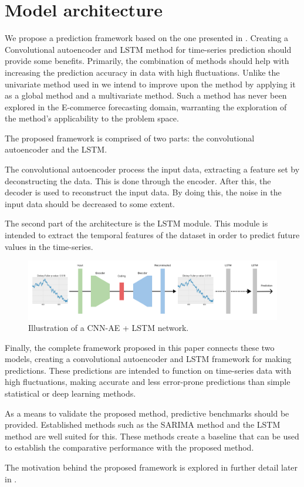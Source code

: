 \section{Model architecture}
\label{section:Architecture:Model}

We propose a prediction framework based on the one presented in \cite{Zhao2019}.
Creating a Convolutional autoencoder and LSTM method for time-series prediction should provide some benefits.
Primarily, the combination of methods should help with increasing the prediction accuracy in data with high fluctuations.
Unlike the univariate method used in \cite{Zhao2019} we intend to improve upon the method by applying it as a global method and a multivariate method.
Such a method has never been explored in the E-commerce forecasting domain, warranting the exploration of the method's applicability to the problem space.

The proposed framework is comprised of two parts: the convolutional autoencoder and the LSTM.

The convolutional autoencoder process the input data, extracting a feature set by deconstructing the data.
This is done through the encoder. After this, the decoder is used to reconstruct the input data.
By doing this, the noise in the input data should be decreased to some extent.

The second part of the architecture is the LSTM module.
This module is intended to extract the temporal features of the dataset
in order to predict future values in the time-series.

\begin{figure}[h!]
  \centering
  \includegraphics[width=\textwidth]{./figs/illustrations/CNN-AE + LSTM.png}
  \hfill
  \caption{Illustration of a CNN-AE + LSTM network.}
  \label{fig:stacked_autoencoder_arch}
\end{figure}

Finally, the complete framework proposed in this paper connects these two models,
creating a convolutional autoencoder and LSTM framework for making predictions.
These predictions are intended to function on time-series data with high fluctuations,
making accurate and less error-prone predictions than simple statistical or deep learning methods.


As a means to validate the proposed method, predictive benchmarks should be provided.
Established methods such as the SARIMA method and the LSTM method are well suited for this.
These methods create a baseline that can be used to establish the comparative performance with the proposed method.

The motivation behind the proposed framework is explored in further detail later in .


